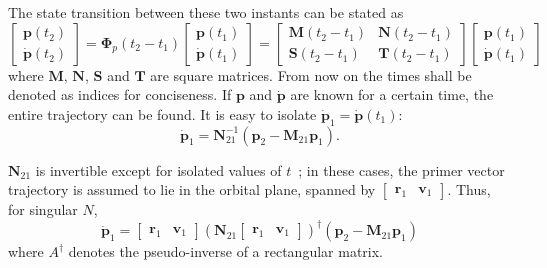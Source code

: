The state transition between these two instants can be stated as
\begin{equation}
    \begin{bmatrix}
        \mathbf{p}(t_2) \\ \dot{\mathbf{p}}(t_2)
    \end{bmatrix} = \mathbf{\Phi}_p(t_2 - t_1) \begin{bmatrix}
        \mathbf{p}(t_1) \\ \dot{\mathbf{p}}(t_1)
    \end{bmatrix} = \begin{bmatrix}
        \mathbf{M}(t_2-t_1) & \mathbf{N}(t_2-t_1) \\ \mathbf{S}(t_2-t_1) & \mathbf{T}(t_2-t_1)
    \end{bmatrix} \begin{bmatrix}
        \mathbf{p}(t_1) \\ \dot{\mathbf{p}}(t_1)
    \end{bmatrix}
\end{equation}
where \(\mathbf{M}\), \(\mathbf{N}\), \(\mathbf{S}\) and \(\mathbf{T}\) are square matrices. From now on the times shall be denoted as indices for conciseness. If \(\mathbf{p}\) and \(\dot{\mathbf{p}}\) are known for a certain time, the entire trajectory can be found. It is easy to isolate \(\dot{\mathbf{p}}_1 = \dot{\mathbf{p}}(t_1)\):
\begin{equation}
    \dot{\mathbf{p}}_1 = \mathbf{N}^{-1}_{21} \left(\mathbf{p}_2 - \mathbf{M}_{21}\mathbf{p}_1\right).
\end{equation}

\(\mathbf{N}_{21}\) is invertible except for isolated values of \(t\)~\cite{Conway_2010}; in these cases, the primer vector trajectory is assumed to lie in the orbital plane, spanned by \(\begin{bmatrix}
    \mathbf{r}_1 & \mathbf{v}_1
\end{bmatrix}\). Thus, for singular \(N\),
\begin{equation}
    \dot{\mathbf{p}}_1 = \begin{bmatrix}
        \mathbf{r}_1 & \mathbf{v}_1
    \end{bmatrix} (\mathbf{N}_{21} \begin{bmatrix}
        \mathbf{r}_1 & \mathbf{v}_1
    \end{bmatrix})^\dagger \left(\mathbf{p}_2 - \mathbf{M}_{21}\mathbf{p}_1\right)
\end{equation}
where \(A^\dagger\) denotes the pseudo-inverse of a rectangular matrix.


